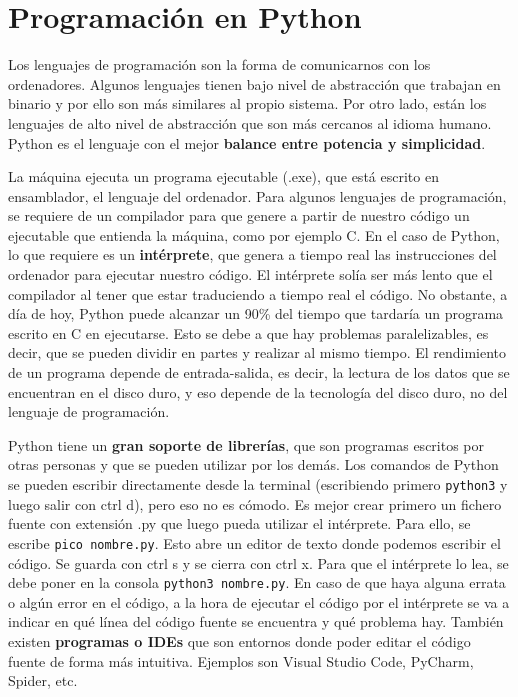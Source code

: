 \chapter{Programación en Python}
Los lenguajes de programación son la forma de comunicarnos con los ordenadores. Algunos lenguajes tienen bajo nivel de abstracción que trabajan en binario y por ello son más similares al propio sistema. Por otro lado, están los lenguajes de alto nivel de abstracción que son más cercanos al idioma humano. Python es el lenguaje con el mejor \textbf{balance entre potencia y simplicidad}. 

La máquina ejecuta un programa ejecutable (.exe), que está escrito en ensamblador, el lenguaje del ordenador. Para algunos lenguajes de programación, se requiere de un compilador para que genere a partir de nuestro código un ejecutable que entienda la máquina, como por ejemplo C. En el caso de Python, lo que requiere es un \textbf{intérprete}, que genera a tiempo real las instrucciones del ordenador para ejecutar nuestro código. El intérprete solía ser más lento que el compilador al tener que estar traduciendo a tiempo real el código. No obstante, a día de hoy, Python puede alcanzar un 90\% del tiempo que tardaría un programa escrito en C en ejecutarse. Esto se debe a que hay problemas paralelizables, es decir, que se pueden dividir en partes y realizar al mismo tiempo. El rendimiento de un programa depende de entrada-salida, es decir, la lectura de los datos que se encuentran en el disco duro, y eso depende de la tecnología del disco duro, no del lenguaje de programación. 

Python tiene un \textbf{gran soporte de librerías}, que son programas escritos por otras personas y que se pueden utilizar por los demás. Los comandos de Python se pueden escribir directamente desde la terminal (escribiendo primero \texttt{python3} y luego salir con ctrl d), pero eso no es cómodo. Es mejor crear primero un fichero fuente con extensión .py que luego pueda utilizar el intérprete. Para ello, se escribe \texttt{pico nombre.py}. Esto abre un editor de texto donde podemos escribir el código. Se guarda con ctrl s y se cierra con ctrl x. Para que el intérprete lo lea, se debe poner en la consola \texttt{python3 nombre.py}. En caso de que haya alguna errata o algún error en el código, a la hora de ejecutar el código por el intérprete se va a indicar en qué línea del código fuente se encuentra y qué problema hay. También existen\textbf{ programas o IDEs} que son entornos donde poder editar el código fuente de forma más intuitiva. Ejemplos son Visual Studio Code, PyCharm, Spider, etc. 

